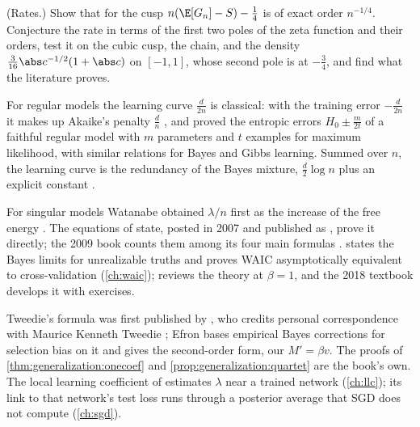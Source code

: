 \begin{refsection}
\begin{exercises}
\item \research\hard (Rates.) Show that for the cusp $n(\E[G_n]-S)-\frac14$ is of exact order $n^{-1/4}$. Conjecture the rate in terms of the first two poles of the zeta function and their orders, test it on the cubic cusp, the chain, and the density $\frac3{16}\abs c^{-1/2}(1+\abs c)$ on $[-1,1]$, whose second pole is at $-\frac34$, and find what the literature proves.\label{ex:generalization:rates}
\end{exercises}

\notesandrefs
For regular models the learning curve $\frac d{2n}$ is classical: with the training error $-\frac d{2n}$ it makes up Akaike's penalty $\frac dn$ \parencite{Akaike1974}, and \textcite{AmariMurata1993} proved the entropic errors $H_0\pm\frac m{2t}$ of a faithful regular model with $m$ parameters and $t$ examples for maximum likelihood, with similar relations for Bayes and Gibbs learning. Summed over $n$, the learning curve is the redundancy of the Bayes mixture, $\frac d2\log n$ plus an explicit constant \parencite{ClarkeBarron1990}.

For singular models Watanabe obtained $\lambda/n$ first as the increase of the free energy \parencite{Watanabe1999,Watanabe2001a}. The equations of state, posted in 2007 and published as \textcite{Watanabe2010a}, prove it directly; the 2009 book counts them among its four main formulas \parencite{Watanabe2009}. \Textcite{Watanabe2010} states the Bayes limits for unrealizable truths and proves WAIC asymptotically equivalent to cross-validation (\cref{ch:waic}); \textcite{Watanabe2024} reviews the theory at $\beta=1$, and the 2018 textbook \parencite{Watanabe2018} develops it with exercises.

Tweedie's formula was first published by \textcite{Robbins1956}, who credits personal correspondence with Maurice Kenneth Tweedie \parencite{Efron2011}; Efron bases empirical Bayes corrections for selection bias on it and gives the second-order form, our $M'=\beta v$. The proofs of \cref{thm:generalization:onecoef} and \cref{prop:generalization:quartet} are the book's own. The local learning coefficient of \textcite{LauEtAl2025} estimates $\lambda$ near a trained network (\cref{ch:llc}); its link to that network's test loss runs through a posterior average that SGD does not compute (\cref{ch:sgd}).


\end{refsection}

